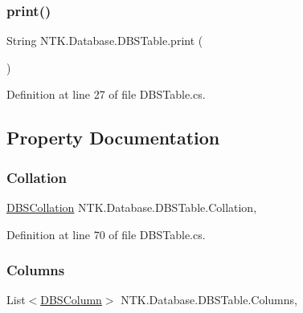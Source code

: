 \subsubsection{\texorpdfstring{print()}{print()}}
{\footnotesize\ttfamily String N\+T\+K.\+Database.\+D\+B\+S\+Table.\+print (\begin{DoxyParamCaption}{ }\end{DoxyParamCaption})}



Definition at line 27 of file D\+B\+S\+Table.\+cs.



\subsection{Property Documentation}
\mbox{\label{class_n_t_k_1_1_database_1_1_d_b_s_table_af946255dbc32b333d4f32720e048a424}} 
\subsubsection{\texorpdfstring{Collation}{Collation}}
{\footnotesize\ttfamily \mbox{\hyperlink{namespace_n_t_k_1_1_database_aa31c221c4926a0f02117557ca9883c03}{D\+B\+S\+Collation}} N\+T\+K.\+Database.\+D\+B\+S\+Table.\+Collation\hspace{0.3cm}{\ttfamily [get]}, {\ttfamily [set]}}



Definition at line 70 of file D\+B\+S\+Table.\+cs.

\mbox{\label{class_n_t_k_1_1_database_1_1_d_b_s_table_ae69b35e58b0cc99a39c8ef79b9eb43ed}} 
\subsubsection{\texorpdfstring{Columns}{Columns}}
{\footnotesize\ttfamily List$<$\mbox{\hyperlink{class_n_t_k_1_1_database_1_1_d_b_s_column}{D\+B\+S\+Column}}$>$ N\+T\+K.\+Database.\+D\+B\+S\+Table.\+Columns\hspace{0.3cm}{\ttfamily [get]}, {\ttfamily [set]}}



